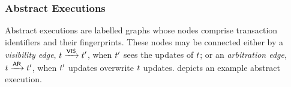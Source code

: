 \subsubsection{Abstract Executions}
Abstract executions are labelled graphs 
whose nodes comprise transaction identifiers and their fingerprints. 
These nodes may be connected either by a \emph{visibility edge}, \(t \xrightarrow{\mathsf{VIS}} 
t'\), when \(t'\) sees the updates of \(t\);  or an \emph{arbitration edge}, \(t \xrightarrow{\mathsf{AR}} 
t'\), when \(t'\) updates overwrite \(t\) updates.
 depicts an example abstract execution.
